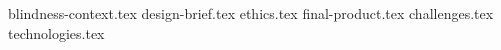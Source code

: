 {blindness-context.tex}
{design-brief.tex}
{ethics.tex}
{final-product.tex}
{challenges.tex}
{technologies.tex}
